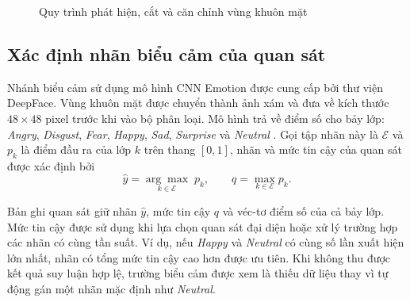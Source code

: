 \documentclass[../LuanVan.tex]{subfiles}
\begin{document}
\begin{figure}[H]
    \centering
    \caption{Quy trình phát hiện, cắt và căn chỉnh vùng khuôn mặt}
    \label{fig:face_extraction_pipeline}
\end{figure}

\subsection{Xác định nhãn biểu cảm của quan sát}
\label{subsection:3.2.3}

Nhánh biểu cảm sử dụng mô hình CNN Emotion được cung cấp bởi thư viện DeepFace. Vùng khuôn mặt được chuyển thành ảnh xám và đưa về kích thước $48\times48$ pixel trước khi vào bộ phân loại. Mô hình trả về điểm số cho bảy lớp: \textit{Angry}, \textit{Disgust}, \textit{Fear}, \textit{Happy}, \textit{Sad}, \textit{Surprise} và \textit{Neutral} \cite{deepfaceEmotionModel}. Gọi tập nhãn này là $\mathcal{E}$ và $p_k$ là điểm đầu ra của lớp $k$ trên thang $[0,1]$, nhãn và mức tin cậy của quan sát được xác định bởi
\begin{equation}
    \widehat{y}=\underset{k\in\mathcal{E}}{\arg\max}\;p_k,
    \qquad q=\max_{k\in\mathcal{E}}p_k.
    \label{eq:ch3_expression_decision}
\end{equation}

Bản ghi quan sát giữ nhãn $\widehat{y}$, mức tin cậy $q$ và véc-tơ điểm số của cả bảy lớp. Mức tin cậy được sử dụng khi lựa chọn quan sát đại diện hoặc xử lý trường hợp các nhãn có cùng tần suất. Ví dụ, nếu \textit{Happy} và \textit{Neutral} có cùng số lần xuất hiện lớn nhất, nhãn có tổng mức tin cậy cao hơn được ưu tiên. Khi không thu được kết quả suy luận hợp lệ, trường biểu cảm được xem là thiếu dữ liệu thay vì tự động gán một nhãn mặc định như \textit{Neutral}.
\end{document}
